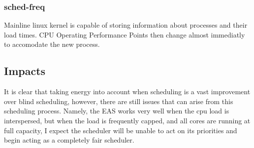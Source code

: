 \subsubsection{sched-freq}
Mainline linux kernel is capable of storing information about processes and their load times. CPU Operating Performance Points then change almost immediatly to accomodate the new process. \cite{EASp2015}

\subsection{Impacts}
It is clear that taking energy into account when scheduling is a vast improvement over blind scheduling, however, there are still issues that can arise from this scheduling process. Namely, the EAS works very well when the cpu load is interspersed, but when the load is frequently capped, and all cores are running at full capacity, I expect the scheduler will be unable to act on its priorities and begin acting as a completely fair scheduler.